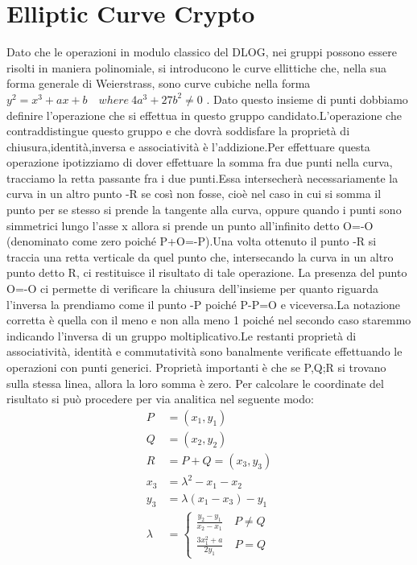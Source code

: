 \documentclass{book}
\begin{document}
\section{Elliptic Curve Crypto}
Dato che le operazioni in modulo classico del DLOG, nei gruppi possono essere risolti in maniera polinomiale, si introducono le curve ellittiche che, nella sua forma generale di Weierstrass, sono curve cubiche nella forma \(y^{2}=x^{3}+ax+b\quad where\ 4a^{3}+27b^2\neq 0\) \@.\newline
Dato questo insieme di punti dobbiamo definire l'operazione che si effettua in questo gruppo candidato.L'operazione che contraddistingue questo gruppo e che dovrà soddisfare la proprietà di chiusura,identità,inversa e associatività è l'addizione.Per effettuare questa operazione ipotizziamo di dover effettuare la somma fra due punti nella curva, tracciamo la retta passante fra i due punti.Essa intersecherà necessariamente la curva in un altro punto -R se così non fosse, cioè nel caso in cui si somma il punto per se stesso si prende la tangente alla curva, oppure quando i punti sono simmetrici lungo l'asse x allora si prende un punto all'infinito detto O=-O (denominato come zero poiché P+O=-P).Una volta ottenuto il punto -R si traccia una retta verticale da quel punto che, intersecando la curva in un altro punto detto R, ci restituisce il risultato di tale operazione\@.\newline
La presenza del punto O=-O ci permette di verificare la chiusura dell'insieme per quanto riguarda l'inversa la prendiamo come il punto -P poiché P-P=O e viceversa.La notazione corretta è quella con il meno e non alla meno 1 poiché nel secondo caso staremmo indicando l'inversa di un gruppo moltiplicativo.Le restanti proprietà di associatività, identità e commutatività sono banalmente verificate effettuando le operazioni con punti generici. Proprietà importanti è che se P,Q;R si trovano sulla stessa linea, allora la loro somma è zero\@.\newline
Per calcolare le coordinate del risultato si può procedere per via analitica nel seguente modo:\begin{align*}
    P&=(x_{1},y_{1})\\
    Q&=(x_{2},y_{2})\\
    R&=P+Q=(x_{3},y_{3})\\
    x_{3}&=\lambda^{2}-x_{1}-x_{2}\\
    y_{3}&=\lambda(x_{1}-x_{3})-y_{1}\\
    \lambda&=\begin{cases}
        \frac{y_{2}-y_{1}}{x_{2}-x_{1}}\quad P\neq Q\\
        \frac{3x_{1}^{2}+a}{2y_{1}}\quad P=Q
    \end{cases}
\end{align*}
\end{document}
